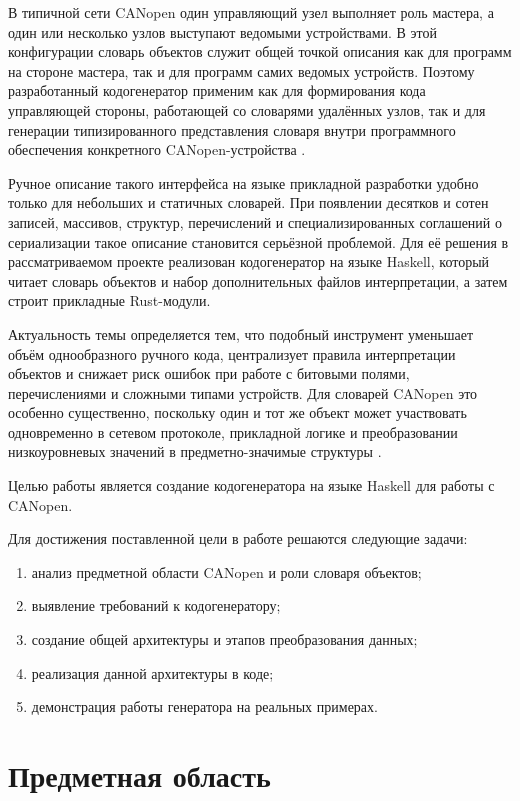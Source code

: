 \documentclass[a4paper,12pt]{article}
\begin{document}
В типичной сети CANopen один управляющий узел выполняет роль мастера, а один или
несколько узлов выступают ведомыми устройствами. В этой конфигурации словарь объектов
служит общей точкой описания как для программ на стороне мастера, так и для программ
самих ведомых устройств. Поэтому разработанный кодогенератор применим как для
формирования кода управляющей стороны, работающей со словарями удалённых узлов, так и
для генерации типизированного представления словаря внутри программного обеспечения
конкретного CANopen-устройства \cite{cia_301_2011,maxon_epos4_control_2024}.

Ручное описание такого интерфейса на языке прикладной разработки удобно только для
небольших и статичных словарей. При появлении десятков и сотен записей, массивов,
структур, перечислений и специализированных соглашений о сериализации такое 
описание становится серьёзной проблемой. Для её решения в рассматриваемом проекте реализован
кодогенератор на языке Haskell, который читает словарь объектов и набор дополнительных
файлов интерпретации, а затем строит прикладные Rust-модули.

Актуальность темы определяется тем, что подобный инструмент уменьшает объём
однообразного ручного кода, централизует правила интерпретации объектов и снижает риск
ошибок при работе с битовыми полями, перечислениями и сложными типами устройств. Для
словарей CANopen это особенно существенно, поскольку один и тот же объект может
участвовать одновременно в сетевом протоколе, прикладной логике и преобразовании
низкоуровневых значений в предметно-значимые структуры \cite{gedenk_object_code,maxon_epos4_firmware}.

Целью работы является создание кодогенератора на языке Haskell для работы с CANopen.

Для достижения поставленной цели в работе решаются следующие задачи:
\begin{enumerate}
  \item анализ предметной области CANopen и роли словаря объектов;
  \item выявление требований к кодогенератору;
  \item создание общей архитектуры и этапов преобразования данных;
  \item реализация данной архитектуры в коде;
  \item демонстрация работы генератора на реальных примерах.
\end{enumerate}

\pagebreak


\section{Предметная область}
\end{document}

